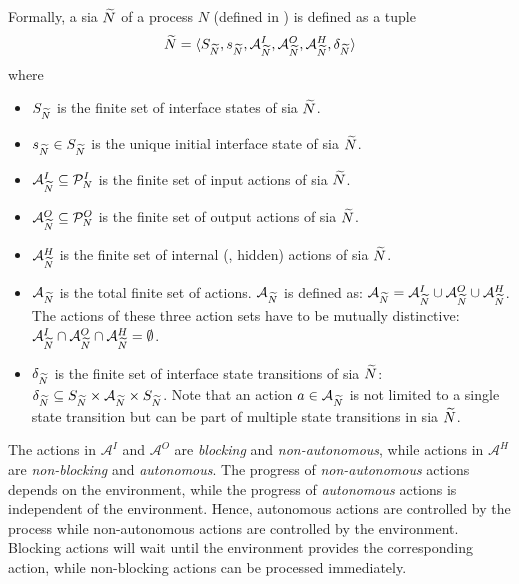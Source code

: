 \begin{definition}[SIA]
    \label{def_sia}
    Formally, a \acrfull{sia} $\widetilde{N}$ of a process $N$ (defined in \Def{\ref{def_proc}}) is defined as a tuple
    \begin{displaymath}
        \widetilde{N} = \langle S_{\widetilde{N}}, s_{\widetilde{N}}, \mathcal{A}_{\widetilde{N}}^I, \mathcal{A}_{\widetilde{N}}^O, \mathcal{A}_{\widetilde{N}}^H, \delta_{\widetilde{N}} \rangle
    \end{displaymath}
    where
    \begin{itemize}
        \item $S_{\widetilde{N}}$ is the finite set of interface states of \gls{sia} $\widetilde{N}$.
        \item $s_{\widetilde{N}} \in S_{\widetilde{N}}$ is the unique initial interface state of \gls{sia} $\widetilde{N}$.
        \item $\mathcal{A}_{\widetilde{N}}^I \subseteq \mathcal{P}_N^I$ is the finite set of input actions of \gls{sia} $\widetilde{N}$.
        \item $\mathcal{A}_{\widetilde{N}}^O \subseteq \mathcal{P}_N^O$ is the finite set of output actions of \gls{sia} $\widetilde{N}$.
        \item $\mathcal{A}_{\widetilde{N}}^H$ is the finite set of internal (\ie, hidden) actions of \gls{sia} $\widetilde{N}$.
        \item $\mathcal{A}_{\widetilde{N}}$ is the total finite set of actions. $\mathcal{A}_{\widetilde{N}}$ is defined as: $\mathcal{A}_{\widetilde{N}} = \mathcal{A}_{\widetilde{N}}^I \cup \mathcal{A}_{\widetilde{N}}^O \cup \mathcal{A}_{\widetilde{N}}^H$.
            The actions of these three action sets have to be mutually distinctive: \hbox{$\mathcal{A}_{\widetilde{N}}^I \cap \mathcal{A}_{\widetilde{N}}^O \cap \mathcal{A}_{\widetilde{N}}^H = \emptyset$}.
        \item $\delta_{\widetilde{N}}$ is the finite set of interface state transitions of \gls{sia} $\widetilde{N}$: $\delta_{\widetilde{N}} \subseteq S_{\widetilde{N}} \times \mathcal{A}_{\widetilde{N}} \times S_{\widetilde{N}}$.
            Note that an action $a \in \mathcal{A}_{\widetilde{N}}$ is not limited to a single state transition but can be part of multiple state transitions in \gls{sia} $\widetilde{N}$.
    \end{itemize}
\end{definition}

The actions in $\mathcal{A}^I$ and $\mathcal{A}^O$ are \emph{blocking} and \emph{non-autonomous}, while actions in $\mathcal{A}^H$ are \emph{non-blocking} and \emph{autonomous}.
The progress of {\em non-autonomous} actions depends on the environment, while the progress of {\em autonomous} actions is independent of the environment.
Hence, autonomous actions are controlled by the process while non-autonomous actions are controlled by the environment.
Blocking actions will wait until the environment provides the corresponding action, while non-blocking actions can be processed immediately.

